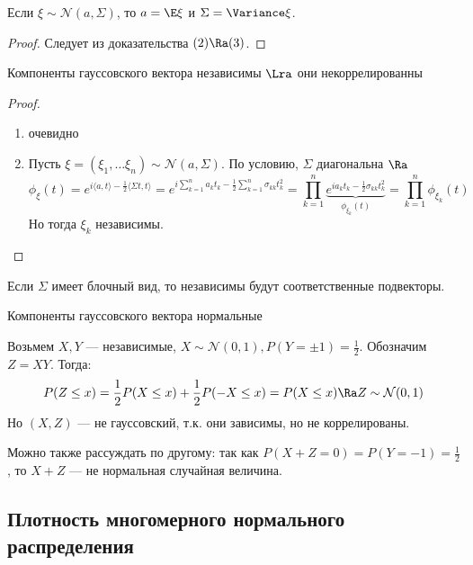 \begin{corollary}
    Если \(\xi \sim \mathcal{N}(a, \Sigma)\), то \(a = \E\xi\) и \(\Sigma = \Variance \xi\).
\end{corollary}
\begin{proof}
    Следует из доказательства \((2) \Ra (3)\). 
\end{proof}

\begin{corollary}
    Компоненты гауссовского вектора независимы \(\Lra\) они некоррелированны
\end{corollary}
\begin{proof}\indent
    \begin{enumerate}
        \item[\(\Ra\)] очевидно
        \item[\(\La\)] Пусть \(\xi = (\xi_1, \dots \xi_n) \sim \mathcal{N}(a, \Sigma)\). По условию, \(\Sigma\) диагональна \(\Ra\)
        \[\phi_\xi(t) = e^{i\langle a, t \rangle - \frac{1}{2}\langle \Sigma t, t \rangle}= e^{i\sum_{k = 1}^na_kt_k - \frac{1}{2}\sum_{k = 1}^n \sigma_{kk}t_k^2} = \prod_{k = 1}^n \underbrace{e^{ia_kt_k - \frac{1}{2}\sigma_{kk}t_k^2}}_{\phi_{\xi_k}(t)} = \prod_{k = 1}^n \phi_{\xi_k}(t)\]
        Но тогда \(\xi_k\) независимы.
    \end{enumerate}
\end{proof}

\begin{corollary}
    Если \(\Sigma\) имеет блочный вид, то независимы будут соответственные подвекторы.
\end{corollary}

\begin{note}
    Компоненты гауссовского вектора нормальные
\end{note}
\begin{example}
    Возьмем \(X, Y\) --- независимые, \(X \sim \mathcal{N}(0, 1), P(Y = \pm1) = \frac{1}{2}\). Обозначим \(Z = XY\). Тогда:
    \[P(Z \le x) = \frac{1}{2}P(X \le x) + \frac{1}{2}P(-X \le x) = P(X \le x) \Ra Z \sim \mathcal{N}(0, 1)\]
    Но \((X, Z)\) --- не гауссовский, т.к. они зависимы, но не коррелированы.

    Можно также рассуждать по другому: так как \(P(X + Z = 0) = P(Y = -1) = \frac{1}{2}\), то \(X + Z\) --- не нормальная случайная величина.
\end{example}

\subsection{Плотность многомерного нормального распределения}

